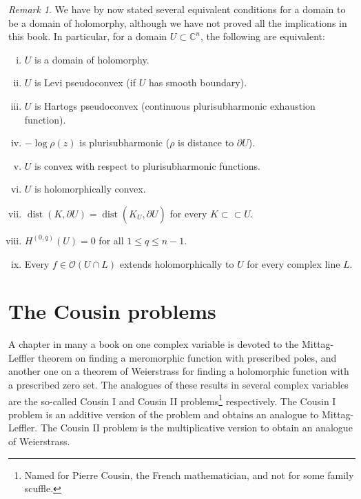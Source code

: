 \documentclass[12pt,openany]{book}
\newcommand{\dist}{\operatorname{dist}}
\newcommand{\C}{{\mathbb{C}}}
\newcommand{\sO}{{\mathscr{O}}}
\theoremstyle{plain}
\theoremstyle{remark}
\newtheorem{remark}[thm]{Remark}
\theoremstyle{definition}
\theoremstyle{exercise}
\theoremstyle{example}
\begin{document}
\begin{remark}
We have by now stated several equivalent conditions for a domain to be a
domain of holomorphy, although we have not proved all the implications in
this book.  In particular, for a domain $U \subset \C^n$, the following are
equivalent:
\begin{enumerate}[(i)]
\item
$U$ is a domain of holomorphy.
\item
$U$ is Levi pseudoconvex (if $U$ has smooth boundary).
\item
$U$ is Hartogs pseudoconvex (continuous plurisubharmonic exhaustion function).
\item
$-\log \rho(z)$ is plurisubharmonic ($\rho$ is distance to $\partial U$).
\item
$U$ is convex with respect to plurisubharmonic functions.
\item
$U$ is holomorphically convex.
\item
$\dist(K,\partial U) = \dist(\hat{K}_U,\partial U)$ for every $K \subset
\subset U$.
\item
$H^{(0,q)}(U) = 0$ for all $1 \leq q \leq n-1$.
\item
Every $f \in \sO(U \cap L)$ extends holomorphically to $U$ for every
complex line $L$.
\end{enumerate}
\end{remark}



\section{The Cousin problems} \label{sec:cousin}

A chapter in many a book on one complex variable is devoted to the
Mittag-Leffler theorem on finding a meromorphic function with prescribed
poles, and another one on a theorem of Weierstrass for finding a holomorphic
function with a prescribed zero set.  The analogues of these results in
several complex variables are the so-called Cousin I and Cousin II
problems\footnote{Named for Pierre Cousin, the French mathematician, and not
for some family scuffle.}
respectively.  The Cousin I problem is an additive
version of the problem and obtains an analogue to Mittag-Leffler.
The Cousin II problem is the multiplicative version to obtain an
analogue of Weierstrass.
\end{document}
